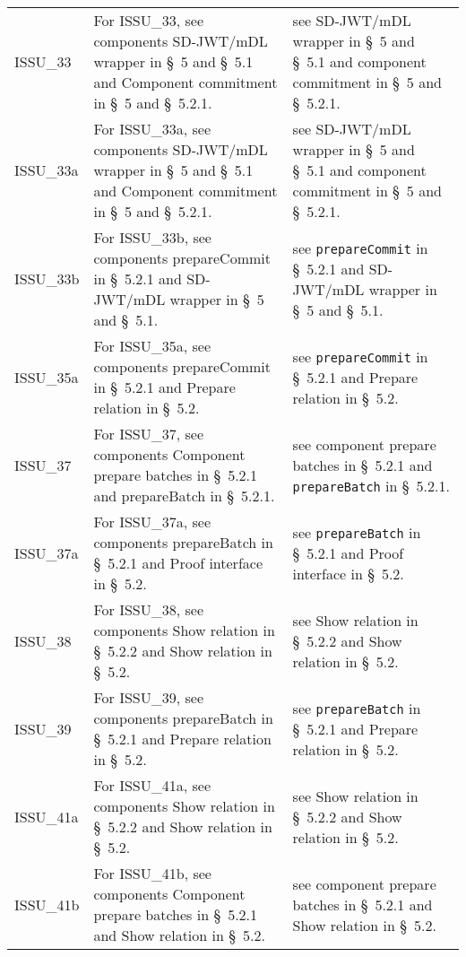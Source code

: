 \begin{landscape}
\begin{longtable}{p{3cm} p{10cm} p{7cm}}
ISSU\_33 &
For ISSU\_33, see components SD-JWT/mDL wrapper in \S~5 and \S~5.1 and Component commitment in \S~5 and \S~5.2.1. &
see SD-JWT/mDL wrapper in \S~5 and \S~5.1 and component commitment in \S~5 and \S~5.2.1. \\

ISSU\_33a &
For ISSU\_33a, see components SD-JWT/mDL wrapper in \S~5 and \S~5.1 and Component commitment in \S~5 and \S~5.2.1. &
see SD-JWT/mDL wrapper in \S~5 and \S~5.1 and component commitment in \S~5 and \S~5.2.1. \\

ISSU\_33b &
For ISSU\_33b, see components prepareCommit in \S~5.2.1 and SD-JWT/mDL wrapper in \S~5 and \S~5.1. &
see \texttt{prepareCommit} in \S~5.2.1 and SD-JWT/mDL wrapper in \S~5 and \S~5.1. \\

ISSU\_35a &
For ISSU\_35a, see components prepareCommit in \S~5.2.1 and Prepare relation in \S~5.2. &
see \texttt{prepareCommit} in \S~5.2.1 and Prepare relation in \S~5.2. \\

ISSU\_37 &
For ISSU\_37, see components Component prepare batches in \S~5.2.1 and prepareBatch in \S~5.2.1. &
see component prepare batches in \S~5.2.1 and \texttt{prepareBatch} in \S~5.2.1. \\

ISSU\_37a &
For ISSU\_37a, see components prepareBatch in \S~5.2.1 and Proof interface in \S~5.2. &
see \texttt{prepareBatch} in \S~5.2.1 and Proof interface in \S~5.2. \\

ISSU\_38 &
For ISSU\_38, see components Show relation in \S~5.2.2 and Show relation in \S~5.2. &
see Show relation in \S~5.2.2 and Show relation in \S~5.2. \\

ISSU\_39 &
For ISSU\_39, see components prepareBatch in \S~5.2.1 and Prepare relation in \S~5.2. &
see \texttt{prepareBatch} in \S~5.2.1 and Prepare relation in \S~5.2. \\

ISSU\_41a &
For ISSU\_41a, see components Show relation in \S~5.2.2 and Show relation in \S~5.2. &
see Show relation in \S~5.2.2 and Show relation in \S~5.2. \\

ISSU\_41b &
For ISSU\_41b, see components Component prepare batches in \S~5.2.1 and Show relation in \S~5.2. &
see component prepare batches in \S~5.2.1 and Show relation in \S~5.2. \\


\end{longtable}
\end{landscape}
